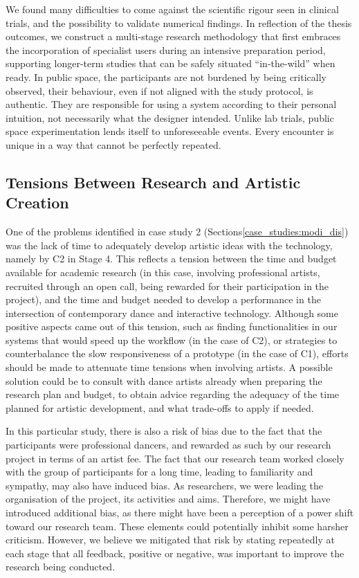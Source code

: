 We found many difficulties to come against the scientific rigour seen in clinical trials, and the possibility to validate numerical findings. In reflection of the thesis outcomes, we construct a multi-stage research methodology that first embraces the incorporation of specialist users during an intensive preparation period, supporting longer-term studies that can be safely situated “in-the-wild” when ready. In public space, the participants are not burdened by being critically observed, their behaviour, even if not aligned with the study protocol, is authentic. They are responsible for using a system according to their personal intuition, not necessarily what the designer intended. Unlike lab trials, public space experimentation lends itself to unforeseeable events. Every encounter is unique in a way that cannot be perfectly repeated.

\subsection{Tensions Between Research and Artistic Creation}

One of the problems identified in case study 2 (Sections\ref{case_studies:modi_dis}) was the lack of time to adequately develop artistic ideas with the technology, namely by C2 in Stage 4. This reflects a tension between the time and budget available for academic research (in this case, involving professional artists, recruited through an open call, being rewarded for their participation in the project), and the time and budget needed to develop a performance in the intersection of contemporary dance and interactive technology. Although some positive aspects came out of this tension, such as finding functionalities in our systems that would speed up the workflow (in the case of C2), or strategies to counterbalance the slow responsiveness of a prototype (in the case of C1), efforts should be made to attenuate time tensions when involving artists. A possible solution could be to consult with dance artists already when preparing the research plan and budget, to obtain advice regarding the adequacy of the time planned for artistic development, and what trade-offs to apply if needed.

In this particular study, there is also a risk of bias due to the fact that the participants were professional dancers, and rewarded as such by our research project in terms of an artist fee. The fact that our research team worked closely with the group of participants for a long time, leading to familiarity and sympathy, may also have induced bias. As researchers, we were leading the organisation of the project, its activities and aims. Therefore, we might have introduced additional bias, as there might have been a perception of a power shift toward our research team. These elements could potentially inhibit some harsher criticism. However, we believe we mitigated that risk by stating repeatedly at each stage that all feedback, positive or negative, was important to improve the research being conducted.

